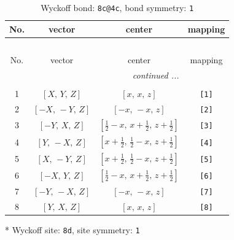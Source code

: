 \documentclass[fleqn,8pt]{jsarticle}
\begin{document}
\renewcommand{\arraystretch}{1.2}
\begin{longtable}{cccc}
\caption{Wyckoff bond: {\tt 8c@4c}, bond symmetry: {\tt 1}}
 \\
 \hline \hline
No. & vector & center & mapping \\ \hline \endfirsthead

\multicolumn{3}{l}{\tablename\ \thetable{}} \\
 \hline \hline
No. & vector & center & mapping \\ \hline \endhead

 \hline \hline
\multicolumn{3}{r}{\footnotesize\it continued ...} \\ \endfoot

 \hline \hline
\multicolumn{3}{r}{} \\ \endlastfoot

1 & $\left[ X,\, Y,\, Z \right]$ & $\left[ x,\, x,\, z \right]$ & {\tt [1]} \\ \hline
2 & $\left[ - X,\, - Y,\, Z \right]$ & $\left[ - x,\, - x,\, z \right]$ & {\tt [2]} \\ \hline
3 & $\left[ - Y,\, X,\, Z \right]$ & $\left[ \frac{1}{2} - x,\, x + \frac{1}{2},\, z + \frac{1}{2} \right]$ & {\tt [3]} \\ \hline
4 & $\left[ Y,\, - X,\, Z \right]$ & $\left[ x + \frac{1}{2},\, \frac{1}{2} - x,\, z + \frac{1}{2} \right]$ & {\tt [4]} \\ \hline
5 & $\left[ X,\, - Y,\, Z \right]$ & $\left[ x + \frac{1}{2},\, \frac{1}{2} - x,\, z + \frac{1}{2} \right]$ & {\tt [5]} \\ \hline
6 & $\left[ - X,\, Y,\, Z \right]$ & $\left[ \frac{1}{2} - x,\, x + \frac{1}{2},\, z + \frac{1}{2} \right]$ & {\tt [6]} \\ \hline
7 & $\left[ - Y,\, - X,\, Z \right]$ & $\left[ - x,\, - x,\, z \right]$ & {\tt [7]} \\ \hline
8 & $\left[ Y,\, X,\, Z \right]$ & $\left[ x,\, x,\, z \right]$ & {\tt [8]} \\
\end{longtable}
* Wyckoff site: {\tt 8d}, site symmetry: {\tt 1}
\renewcommand{\arraystretch}{1.2}
\end{document}
